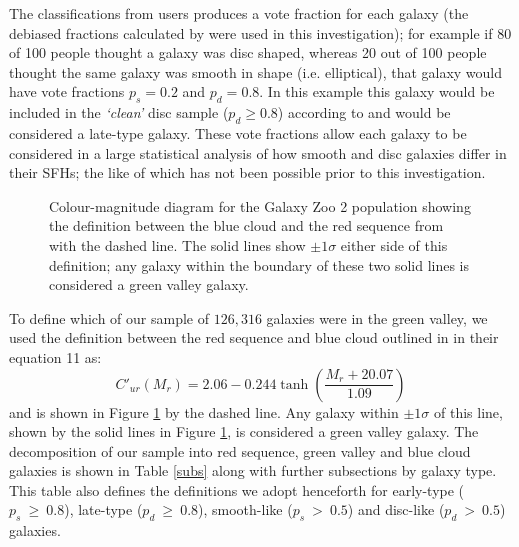 \documentclass{mn2e}
\begin{document}
The classifications from users produces a vote fraction for each galaxy (the debiased fractions calculated by \citet{GZ2} were used in this investigation); for example if 80 of 100 people thought a galaxy was disc shaped, whereas 20 out of 100 people thought the same galaxy was smooth in shape (i.e. elliptical), that galaxy would have vote fractions $p_{s} = 0.2$ and $p_{d} = 0.8$. In this example this galaxy would be included in the \emph{`clean'} disc sample ($p_d \geq 0.8$) according to \cite{GZ2} and would be considered a late-type galaxy. These vote fractions allow each galaxy to be considered in a large statistical analysis of how smooth and disc galaxies differ in their SFHs; the like of which has not been possible prior to this investigation.

\begin{figure}
\caption{Colour-magnitude diagram for the Galaxy Zoo 2 population showing the definition between the blue cloud and the red sequence from \citet{Baldry04} with the dashed line. The solid lines show $\pm 1\sigma$ either side of this definition; any galaxy within the boundary of these two solid lines is considered a green valley galaxy.}
\label{CMGV}
\end{figure}

To define which of our sample of $126, 316$ galaxies were in the green valley, we used the definition between the red sequence and blue cloud outlined in \citet{Baldry04} in their equation 11 as:
\begin{equation}
C'_{ur}(M_{r}) = 2.06 - 0.244 \tanh \left( \frac{M_r + 20.07}{1.09}\right)
\end{equation}
and is shown in Figure \ref{CMGV} by the dashed line. Any galaxy within $\pm 1\sigma$ of this line, shown by the solid lines in Figure \ref{CMGV}, is considered a green valley galaxy. The decomposition of our sample into red sequence, green valley and blue cloud galaxies is shown in Table \ref{subs} along with further subsections by galaxy type. This table also defines the definitions we adopt henceforth for early-type ($p_s~ \geq~0.8$), late-type ($p_d~ \geq~0.8$), smooth-like ($p_s~ >~0.5$) and disc-like ($p_d~ >~0.5$) galaxies. 
\end{document}
